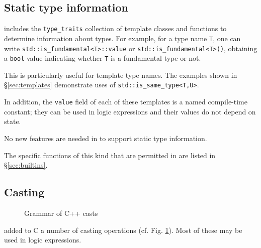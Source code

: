 \subsection{Static type information}

\lang includes the \lstinline|type_traits| collection of template classes and functions to determine information about types.
For example, for a type name \lstinline|T|, one can write
\lstinline|std::is_fundamental<T>::value| or
\lstinline|std::is_fundamental<T>()|, obtaining a 
\lstinline|bool| value indicating whether 
\lstinline|T| is a fundamental type or not.

This is particularly useful for template type names. The examples shown in \S\ref{sec:templates} demonstrate uses of \lstinline|std::is_same_type<T,U>|.

In addition, the \lstinline|value| field of each of these templates is a named \lang compile-time constant; they can be used in logic expressions and their values do not depend on state.

No new features are needed in \NAME to support static type information. 

The specific \lang functions of this kind that are permitted in \NAME are listed in \S\ref{sec:builtins}.

\subsection{Casting}
\label{sec:casts}

\begin{figure}[t]
  \begin{cadre}
     
    \end{cadre}
    \caption{Grammar of C++ casts}
  \label{fig:gram:cpp-casts}
\end{figure}

\lang added to C a number of casting operations (cf. Fig. \ref{fig:gram:cpp-casts}). 
Most of these may be used in logic expressions.

